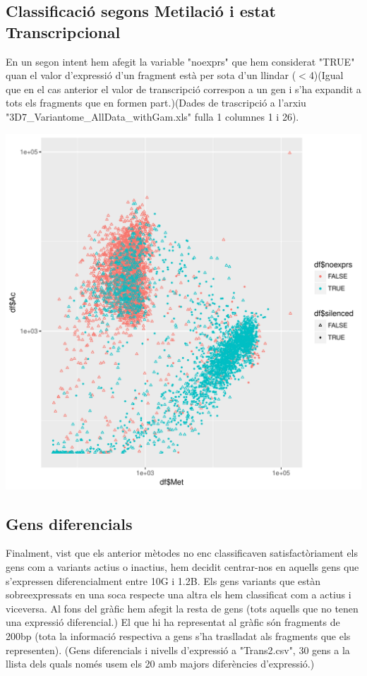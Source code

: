 \documentclass{article}\usepackage[]{graphicx}\usepackage[]{color}
\newenvironment{knitrout}{}{} %
\begin{document}
\subsection{Classificació segons Metilació i estat Transcripcional}
En un segon intent hem afegit la variable "noexprs" que hem considerat "TRUE" quan el valor d'expressió d'un fragment està per sota d'un llindar ($<$4)(Igual que en el cas anterior el valor de transcripció correspon a un gen i s'ha expandit a tots els fragments que en formen part.)(Dades de trascripció a l'arxiu "3D7\_Variantome\_AllData\_withGam.xls" fulla 1 columnes 1 i 26).
\begin{knitrout}
\color{fgcolor}

{\centering \includegraphics[width=1\linewidth]{figure/minimal-ac_met_log-1} 

}



\end{knitrout}
\clearpage
\subsection{Gens diferencials}
Finalment, vist que els anterior mètodes no enc classificaven satisfactòriament els gens com a variants actius o inactius, hem decidit centrar-nos en aquells gens que s'expressen diferencialment entre 10G i 1.2B. 
Els gens variants que estàn sobreexpressats en una soca respecte una altra els hem classificat com a actius i viceversa.
Al fons del gràfic hem afegit la resta de gens (tots aquells que no tenen una expressió diferencial.)
El que hi ha representat al gràfic són fragments de 200bp (tota la informació respectiva a gens s'ha traslladat als fragments que els representen). (Gens diferencials i nivells d'expressió a "Trans2.csv", 30 gens a la llista dels quals només usem els 20 amb majors diferències d'expressió.)
\clearpage
\end{document}
